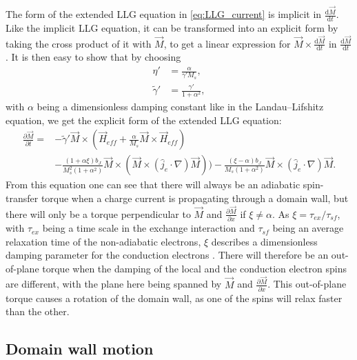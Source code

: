 \documentclass[12pt, a4paper, twoside, openright]{article}		%
\numberwithin{equation}{section}
\begin{document}
The form of the extended LLG equation in \eqref{eq:LLG_current} is implicit in $\frac{\textrm{d} \vec{M}}{\textrm{d} t}$. Like the implicit LLG equation, it can be transformed into an explicit form by taking the cross product of it with $\vec{M}$, to get a linear expression for $\vec{M}\times\frac{\textrm{d} \vec{M}}{\textrm{d} t}$ in $\frac{\textrm{d} \vec{M}}{\textrm{d} t}$. It is then easy to show that by choosing
\begin{align}
\eta' &= \frac{\alpha}{\gamma ' M_s}, \\
\tilde{\gamma}' &= \frac{\gamma '}{1+\alpha^2},
\end{align}
with $\alpha$ being a dimensionless damping constant like in the Landau--Lifshitz equation, we get the explicit form of the extended LLG equation:
\begin{align}
\nonumber \frac{\partial \vec{M}}{\partial t} = &-\tilde{\gamma}' \vec{M} \times  \left(\vec{H}_{eff} + \frac{\alpha}{M_s} \vec{M}\times \vec{H}_{eff}\right) \\ 
&- \frac{(1+\alpha\xi) b_J}{M_s^2(1+\alpha^2)} \vec{M}\times (\vec{M}\times(\hat{j}_e\cdot\nabla)\vec{M})) - \frac{(\xi-\alpha)b_J}{ M_s(1+\alpha^2)}\vec{M}\times(\hat{j}_e\cdot\nabla)\vec{M}.
\label{eq:LLG_current_explicit}
\end{align}
From this equation one can see that there will always be an adiabatic spin-transfer torque when a charge current is propagating through a domain wall, but there will only be a torque perpendicular to $\vec{M}$ and $\frac{\partial\vec{M}}{\partial x}$ if $\xi \neq \alpha$. As $\xi = \tau_{ex}/\tau_{sf}$, with $\tau_{ex}$ being a time scale in the exchange interaction and $\tau_{sf}$ being an average relaxation time of the non-adiabatic electrons, $\xi$ describes a dimensionless damping parameter for the conduction electrons \cite{kruger2006current}. There will therefore be an out-of-plane torque when the damping of the local and the conduction electron spins are different, with the plane here being spanned by $\vec{M}$ and $\frac{\partial\vec{M}}{\partial x}$. This out-of-plane torque causes a rotation of the domain wall, as one of the spins will relax faster than the other.

\subsection{Domain wall motion}
\end{document}
